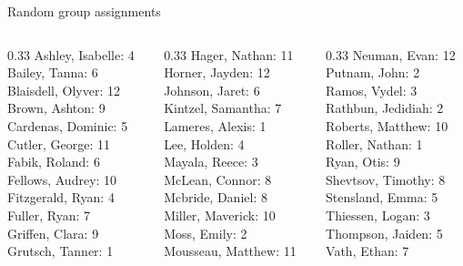 \documentclass[10pt]{beamer}
\begin{document}
\begin{frame}{Random group assignments}

\begin{columns}
\begin{column}{0.33\textwidth}
Ashley, Isabelle: 4 \\ 
Bailey, Tanna: 6 \\ 
Blaisdell, Olyver: 12 \\ 
Brown, Ashton: 9 \\ 
Cardenas, Dominic: 5 \\ 
Cutler, George: 11 \\ 
Fabik, Roland: 6 \\ 
Fellows, Audrey: 10 \\ 
Fitzgerald, Ryan: 4 \\ 
Fuller, Ryan: 7 \\ 
Griffen, Clara: 9 \\ 
Grutsch, Tanner: 1 \\\end{column}
\begin{column}{0.33\textwidth}
Hager, Nathan: 11 \\ 
Horner, Jayden: 12 \\ 
Johnson, Jaret: 6 \\ 
Kintzel, Samantha: 7 \\ 
Lameres, Alexis: 1 \\ 
Lee, Holden: 4 \\ 
Mayala, Reece: 3 \\ 
McLean, Connor: 8 \\ 
Mcbride, Daniel: 8 \\ 
Miller, Maverick: 10 \\ 
Moss, Emily: 2 \\ 
Mousseau, Matthew: 11 \\\end{column}
\begin{column}{0.33\textwidth}
Neuman, Evan: 12 \\ 
Putnam, John: 2 \\ 
Ramos, Vydel: 3 \\ 
Rathbun, Jedidiah: 2 \\ 
Roberts, Matthew: 10 \\ 
Roller, Nathan: 1 \\ 
Ryan, Otis: 9 \\ 
Shevtsov, Timothy: 8 \\ 
Stensland, Emma: 5 \\ 
Thiessen, Logan: 3 \\ 
Thompson, Jaiden: 5 \\ 
Vath, Ethan: 7 \\\end{column}
\end{columns}

	
\end{frame}
\end{document}
